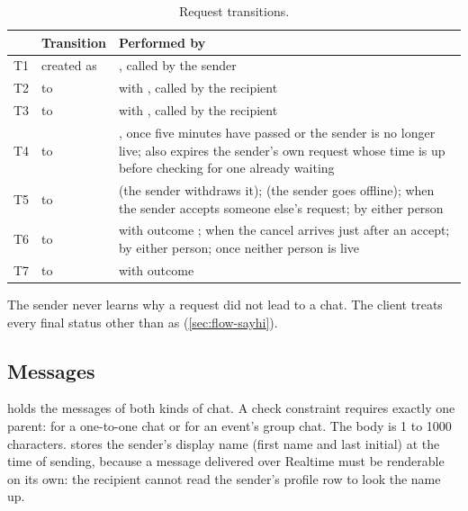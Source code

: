 \begin{table}[ht]
  \centering
  \caption{Request transitions.}
  \label{tab:request-transitions}
  \tablefont
  \begin{tabularx}{\textwidth}{@{}L{8mm}L{44mm}Y@{}}
    \toprule
    & \textsf{\textbf{Transition}} & \textsf{\textbf{Performed by}} \\
    \midrule
    T1 & created as  & , called by the sender \\
    T2 &  to  &  with , called by the recipient \\
    T3 &  to  &  with , called by the recipient \\
    T4 &  to  & , once five minutes have passed or the sender is no longer live;  also expires the sender's own request whose time is up before checking for one already waiting \\
    T5 &  to  &  (the sender withdraws it);  (the sender goes offline);  when the sender accepts someone else's request;  by either person \\
    T6 &  to  &  with outcome ;  when the cancel arrives just after an accept;  by either person;  once neither person is live \\
    T7 &  to  &  with outcome  \\
    \bottomrule
  \end{tabularx}
\end{table}

The sender never learns why a request did not lead to a chat. The client treats every final status other
than  as  (\cref{sec:flow-sayhi}).

\subsection{Messages}

 holds the messages of both kinds of chat. A check constraint requires exactly one parent:
 for a one-to-one chat or  for an event's group chat. The body is 1 to
1000 characters.  stores the sender's display name (first name and last initial) at the
time of sending, because a message delivered over Realtime must be renderable on its own: the recipient
cannot read the sender's profile row to look the name up.

